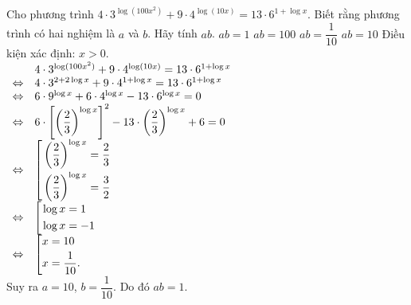 \begin{ex}%
 Cho phương trình $4 \cdot 3^{\log(100x^2)} + 9 \cdot 4^{\log(10x)} = 13 \cdot 6^{1 + \log x}$. Biết rằng phương trình có hai nghiệm là $a$ và $b$. Hãy tính $ab$.
 \choice
  {\True $ab = 1$}
  {$ab = 100$}
  {$ab = \dfrac{1}{10}$}
  {$ab = 10$}
 \loigiai
  {
  Điều kiện xác định: $x > 0$.\\
  \allowdisplaybreaks
  $\begin{array}{ll}
  				   & 4 \cdot 3^{\log(100x^2)} + 9 \cdot 4^{\log(10x)} = 13 \cdot 6^{1 + \log x}\\
   \Leftrightarrow & 4 \cdot 3^{2 + 2 \log x} + 9 \cdot 4^{1 + \log x} = 13 \cdot 6^{1 + \log x}\\
   \Leftrightarrow & 6 \cdot 9^{\log x} + 6 \cdot 4^{\log x} - 13 \cdot 6^{\log x} = 0\\
   \Leftrightarrow & 6 \cdot \left[ \left( \dfrac{2}{3} \right)^{\log x} \right]^2 - 13 \cdot \left( \dfrac{2}{3} \right)^{\log x} + 6 = 0\\
   \Leftrightarrow & \left[\begin{aligned}& \left( \dfrac{2}{3} \right)^{\log x} = \dfrac{2}{3} \\& \left( \dfrac{2}{3} \right)^{\log x} = \dfrac{3}{2}\end{aligned}\right.\\
   \Leftrightarrow & \left[\begin{aligned}& \log x = 1 \\& \log x = -1\end{aligned}\right.\\
   \Leftrightarrow & \left[\begin{aligned}& x = 10 \\& x = \dfrac{1}{10}.\end{aligned}\right.
  \end{array}$\\
  Suy ra $a = 10$, $b = \dfrac{1}{10}$. Do đó $ab = 1$.
  }
\end{ex}


